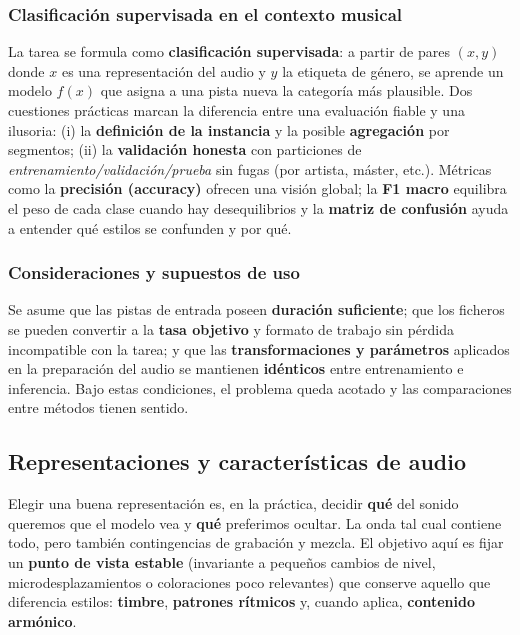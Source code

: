 \documentclass[12pt,twoside]{article}
\begin{document}
\subsubsection{Clasificación supervisada en el contexto musical}

La tarea se formula como \textbf{clasificación supervisada}: a partir de pares $(x,y)$ donde $x$ es una representación del audio y $y$ la etiqueta de género, se aprende un modelo $f(x)$ que asigna a una pista nueva la categoría más plausible. Dos cuestiones prácticas marcan la diferencia entre una evaluación fiable y una ilusoria: (i) la \textbf{definición de la instancia} y la posible \textbf{agregación} por segmentos; (ii) la \textbf{validación honesta} con particiones de \emph{entrenamiento/validación/prueba} sin fugas (por artista, máster, etc.). Métricas como la \textbf{precisión (accuracy)} ofrecen una visión global; la \textbf{F1 macro} equilibra el peso de cada clase cuando hay desequilibrios y la \textbf{matriz de confusión} ayuda a entender qué estilos se confunden y por qué.

\subsubsection{Consideraciones y supuestos de uso}

Se asume que las pistas de entrada poseen \textbf{duración suficiente}; que los ficheros se pueden convertir a la \textbf{tasa objetivo} y formato de trabajo sin pérdida incompatible con la tarea; y que las \textbf{transformaciones y parámetros} aplicados en la preparación del audio se mantienen \textbf{idénticos} entre entrenamiento e inferencia. Bajo estas condiciones, el problema queda acotado y las comparaciones entre métodos tienen sentido.

\subsection{Representaciones y características de audio}

Elegir una buena representación es, en la práctica, decidir \textbf{qué} del sonido queremos que el modelo vea y \textbf{qué} preferimos ocultar. La onda tal cual contiene todo, pero también contingencias de grabación y mezcla. El objetivo aquí es fijar un \textbf{punto de vista estable} (invariante a pequeños cambios de nivel, microdesplazamientos o coloraciones poco relevantes) que conserve aquello que diferencia estilos: \textbf{timbre}, \textbf{patrones rítmicos} y, cuando aplica, \textbf{contenido armónico}.
\end{document}
